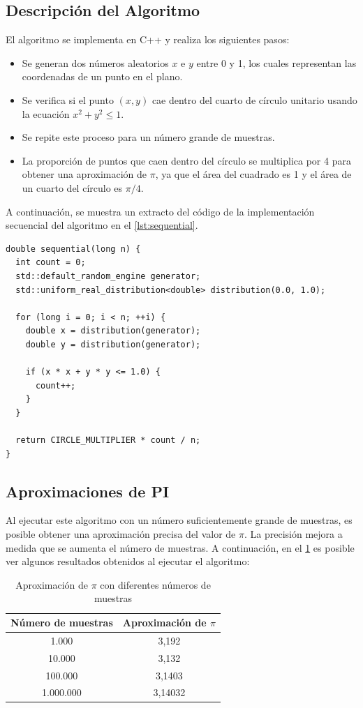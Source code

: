 \documentclass[a4paper, 10pt, onecolumn]{IEEEtran}
\begin{document}
\subsection{Descripción del Algoritmo}
El algoritmo se implementa en C++ y realiza los siguientes pasos:

\begin{itemize}
    \item Se generan dos números aleatorios $x$ e $y$ entre 0 y 1, los cuales representan las coordenadas de un punto en el plano.
    \item Se verifica si el punto $(x, y)$ cae dentro del cuarto de círculo unitario usando la ecuación $x^2 + y^2 \leq 1$.
    \item Se repite este proceso para un número grande de muestras.
    \item La proporción de puntos que caen dentro del círculo se multiplica por 4 para obtener una aproximación de $\pi$, ya que el área del cuadrado es 1 y el área de un cuarto del círculo es $\pi/4$.
\end{itemize}

A continuación, se muestra un extracto del código de la implementación secuencial del algoritmo en el \cref{lst:sequential}.

\begin{lstlisting}[caption={Implementación Secuencial de Monte Carlo en C++}, label={lst:sequential}]
double sequential(long n) {
  int count = 0;
  std::default_random_engine generator;
  std::uniform_real_distribution<double> distribution(0.0, 1.0);
  
  for (long i = 0; i < n; ++i) {
    double x = distribution(generator);
    double y = distribution(generator);
    
    if (x * x + y * y <= 1.0) {
      count++;
    }
  }
  
  return CIRCLE_MULTIPLIER * count / n;
}
\end{lstlisting}

\subsection{Aproximaciones de PI}
Al ejecutar este algoritmo con un número suficientemente grande de muestras, es posible obtener una aproximación precisa del valor de $\pi$. La precisión mejora a medida que se aumenta el número de muestras. A continuación, en el \cref{tab:results} es posible ver algunos resultados obtenidos al ejecutar el algoritmo:

\begin{table}[H]
    \centering
    \begin{tabular}{|c|c|}
    \hline
    \textbf{Número de muestras} & \textbf{Aproximación de $\pi$} \\
    \hline
    1.000 & 3,192 \\
    10.000 & 3,132 \\
    100.000 & 3,1403 \\
    1.000.000 & 3,14032 \\
    \hline
    \end{tabular}
    \caption{Aproximación de $\pi$ con diferentes números de muestras}
    \label{tab:results}
\end{table}
\end{document}

